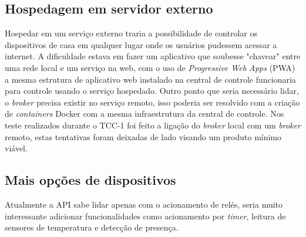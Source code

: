 \subsection{Hospedagem em servidor externo}
Hospedar em um serviço externo traria a possibilidade de controlar os dispositivos de casa em qualquer lugar onde os usuários pudessem acessar a internet. A dificuldade estava em fazer um aplicativo que soubesse "chavear" entre uma rede local e um serviço na web, com o uso de \textit{Progressive Web Apps} (PWA) a mesma estrutura de aplicativo web instalado na central de controle funcionaria para controle usando o serviço hospedado. Outro ponto que seria necessário lidar, o \textit{broker} precisa existir no serviço remoto, isso poderia ser resolvido com a criação de \textit{containers} Docker com a mesma infraestrutura da central de controle. Nos teste realizados durante o TCC-1 foi feito a ligação do \textit{broker} local com um \textit{broker} remoto, estas tentativas foram deixadas de lado visando um produto mínimo viável.

\subsection{Mais opções de dispositivos}
Atualmente a API sabe lidar apenas com o acionamento de relés, seria muito interessante adicionar funcionalidades como acionamento por \textit{timer}, leitura de sensores de temperatura e detecção de presença.



